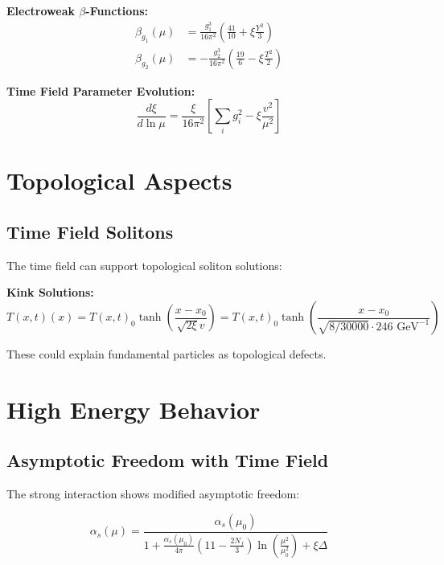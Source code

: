 \documentclass[12pt,a4paper]{report}
\newcommand{\Tfield}{T(x,t)}  %
\newcommand{\xipar}{\xi}      %
\begin{document}
	\textbf{Electroweak $\beta$-Functions:}
	\begin{align}
		\beta_{g_1}(\mu) &= \frac{g_1^3}{16\pi^2} \left(\frac{41}{10} + \xipar \frac{Y^2}{3}\right) \\
		\beta_{g_2}(\mu) &= -\frac{g_2^3}{16\pi^2} \left(\frac{19}{6} - \xipar \frac{T^2}{2}\right)
	\end{align}
	
	\textbf{Time Field Parameter Evolution:}
	\begin{equation}
		\frac{d\xipar}{d\ln\mu} = \frac{\xipar}{16\pi^2} \left[\sum_i g_i^2 - \xipar \frac{v^2}{\mu^2}\right]
	\end{equation}
	
	\section{Topological Aspects}\label{sec:topological_aspects}
	
	\subsection{Time Field Solitons}\label{subsec:timefield_solitons}
	
	The time field can support topological soliton solutions:
	
	\textbf{Kink Solutions:}
	\begin{equation}\label{eq:kink_solution}
		\Tfield(x) = \Tfield_0 \tanh\left(\frac{x - x_0}{\sqrt{2\xipar} v}\right) = \Tfield_0 \tanh\left(\frac{x - x_0}{\sqrt{8/30000} \cdot 246 \text{ GeV}^{-1}}\right)
	\end{equation}
	
	These could explain fundamental particles as topological defects.
	
	\section{High Energy Behavior}\label{sec:high_energy_behavior}
	
	\subsection{Asymptotic Freedom with Time Field}\label{subsec:asymptotic_freedom}
	
	The strong interaction shows modified asymptotic freedom:
	
	\begin{equation}
		\alpha_s(\mu) = \frac{\alpha_s(\mu_0)}{1 + \frac{\alpha_s(\mu_0)}{4\pi} \left(11 - \frac{2N_f}{3}\right) \ln\left(\frac{\mu^2}{\mu_0^2}\right) + \xipar \Delta}
	\end{equation}
	
\end{document}
